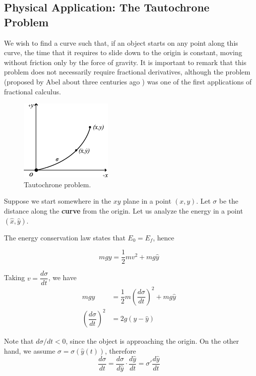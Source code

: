 \subsection{Physical Application: The Tautochrone Problem}
    
    We wish to find a curve such that, if an object starts on any point along this curve, the time that it requires to slide down to the origin is constant, moving without friction only by the force of gravity. It is important to remark that this problem does not necessarily require fractional derivatives, although the problem (proposed by Abel about three centuries ago \cite{kisela2008fractional}) was one of the first applications of fractional calculus.
    
    \begin{figure}[H]
        \centering
        \includegraphics[scale=1.75]{files/taut.pdf}
        \caption{Tautochrone problem.}
        \label{fig:taut}
    \end{figure}
    
    Suppose we start somewhere in the $xy$ plane in a point $(x,y)$. Let $\sigma$ be the distance along the \textbf{curve} from the origin. Let us analyze the energy in a point $(\hat{x},\hat{y})$. 
    
    The energy conservation law states that $E_0 = E_f$, hence 
    
    \begin{equation}
        mgy = \dfrac{1}{2}mv^2 + mg\hat{y}
    \end{equation}
    
    Taking $v=\dfrac{d\sigma}{dt}$, we have
    \begin{align*}
        mgy &= \dfrac{1}{2}m\left(\dfrac{d\sigma}{dt}\right)^2 + mg\hat{y}\\
        \left(\dfrac{d\sigma}{dt}\right)^2 &= 2g(y-\hat{y})
    \end{align*}
    
    Note that $d\sigma/dt < 0$, since the object is approaching the origin. On the other hand, we assume $\sigma=\sigma(\hat{y}(t))$, therefore
    \begin{equation*}
        \dfrac{d\sigma}{dt}=\dfrac{d\sigma}{d\hat{y}}\cdot\dfrac{d\hat{y}}{dt}=\sigma'\dfrac{d\hat{y}}{dt}
    \end{equation*}
    
